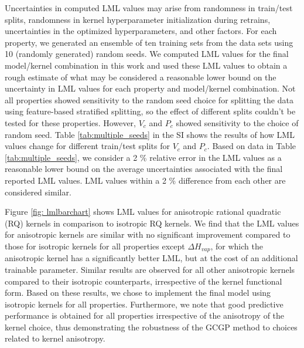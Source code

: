 \documentclass[journal=jacsat,manuscript=article, ]{achemso}
\begin{document}
Uncertainties in computed LML values may arise from randomness in train/test splits, randomness in kernel hyperparameter initialization during retrains, uncertainties in the optimized hyperparameters, and other factors. 
For each property, we generated an ensemble of ten training sets from the data sets using 10 (randomly generated) random seeds. We computed LML values for the final model/kernel combination in this work and used these LML values to obtain a rough estimate of what may be considered a reasonable lower bound on the uncertainty in LML values for each property and model/kernel combination.  Not all properties showed sensitivity to the random seed choice for splitting the data using feature-based stratified splitting, so the effect of different splits couldn't be tested for these properties. 
However, $V_c$ and $P_c$ showed sensitivity to the choice of random seed. Table \ref{tab:multiple_seeds} in the SI shows the results of how LML values change for different train/test splits for $V_c$ and $P_c$. Based on data in Table \ref{tab:multiple_seeds}, we consider a 2 \% relative error in the LML values as a reasonable lower bound on the average uncertainties associated with the final reported LML values. LML values within a 2 \% difference from each other are considered similar.
 
Figure \ref{fig: lmlbarchart} shows LML values for anisotropic rational quadratic (RQ) kernels in comparison to isotropic RQ kernels.
We find that the LML values for anisotropic kernels are similar with no significant improvement compared to those for isotropic kernels for all properties except $\Delta H_{vap}$, for which the anisotropic kernel has a significantly better LML, but at the cost of an additional trainable parameter.
Similar results are observed for all other anisotropic kernels compared to their isotropic counterparts, irrespective of the kernel functional form. 
Based on these results, we chose to implement the final model using isotropic kernels for all properties. 
Furthermore, we note that good predictive performance is obtained for all properties irrespective of the anisotropy of the kernel choice, thus demonstrating the robustness of the GCGP method to choices related to kernel anisotropy. 
\end{document}
